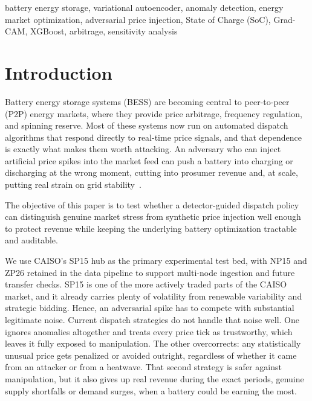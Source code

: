 \documentclass[journal]{IEEEtran}
\begin{document}
\begin{IEEEkeywords}
battery energy storage, variational autoencoder, anomaly detection, energy market optimization, adversarial price injection, State of Charge (SoC), Grad-CAM, XGBoost, arbitrage, sensitivity analysis
\end{IEEEkeywords}

\section{Introduction}

Battery energy storage systems (BESS) are becoming central to peer-to-peer (P2P) energy markets, where they provide price arbitrage, frequency regulation, and spinning reserve. Most of these systems now run on automated dispatch algorithms that respond directly to real-time price signals, and that dependence is exactly what makes them worth attacking. An adversary who can inject artificial price spikes into the market feed can push a battery into charging or discharging at the wrong moment, cutting into prosumer revenue and, at scale, putting real strain on grid stability~\cite{Vulnerability_Analysis}.

The objective of this paper is to test whether a detector-guided dispatch policy can distinguish genuine market stress from synthetic price injection well enough to protect revenue while keeping the underlying battery optimization tractable and auditable.

We use CAISO's SP15 hub as the primary experimental test bed, with NP15 and ZP26 retained in the data pipeline to support multi-node ingestion and future transfer checks. SP15 is one of the more actively traded parts of the CAISO market, and it already carries plenty of volatility from renewable variability and strategic bidding. Hence, an adversarial spike has to compete with substantial legitimate noise. Current dispatch strategies do not handle that noise well. One ignores anomalies altogether and treats every price tick as trustworthy, which leaves it fully exposed to manipulation. The other overcorrects: any statistically unusual price gets penalized or avoided outright, regardless of whether it came from an attacker or from a heatwave. That second strategy is safer against manipulation, but it also gives up real revenue during the exact periods, genuine supply shortfalls or demand surges, when a battery could be earning the most.
\end{document}
